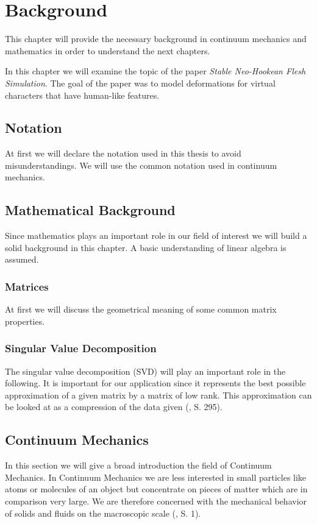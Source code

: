 \chapter{Background} \label{c:Background}
This chapter will provide the necessary background in continuum mechanics and mathematics in order to understand the next chapters.

In this chapter we will examine the topic of the paper \textit{Stable Neo-Hookean Flesh Simulation}. The goal of the paper was to model deformations for virtual characters that have human-like features.


\section{Notation}
At first we will declare the notation used in this thesis to avoid misunderstandings. We will use the common notation used in continuum mechanics.

\section{Mathematical Background}

Since mathematics plays an important role in our field of interest we will build a solid background in this chapter. A basic understanding of linear algebra is assumed.

\subsection{Matrices}
At first we will discuss the geometrical meaning of some common matrix properties.


\subsection{Singular Value Decomposition}

The singular value decomposition (SVD) will play an important role in the following. It is important for our application since it represents the best possible approximation of a given matrix by a matrix of low rank. This approximation can be looked at as a compression of the data given (\cite{LiesenMehrmann2015}, S. 295).

\section{Continuum Mechanics}
In this section we will give a broad introduction the field of Continuum Mechanics.
In Continuum Mechanics we are less interested in small particles like atoms or molecules of an object but concentrate on pieces of matter which are in comparison very large. We are therefore concerned with the mechanical behavior of solids and fluids on the macroscopic scale (\cite{Spencer1980}, S. 1).


